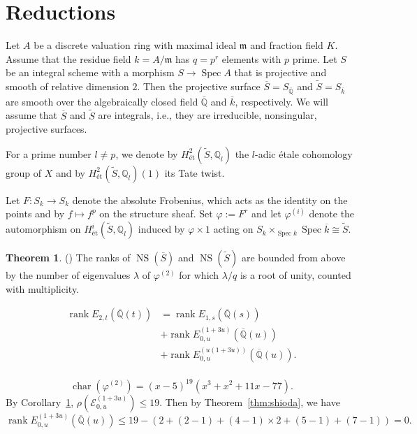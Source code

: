 \documentclass[a4paper]{jarticle} %
\theoremstyle{definition}
\newtheorem{thm}{Theorem}[section]
\theoremstyle{remark}
\DeclareMathOperator{\rank}{rank}
\DeclareMathOperator{\NS}{NS}
\DeclareMathOperator{\chara}{char}
\DeclareMathOperator{\Spec}{Spec}
\begin{document}
\section{Reductions}
Let $A$ be a discrete valuation ring with maximal ideal $\mathfrak{m}$ and fraction field $K$.
Assume that the residue field $k=A/\mathfrak{m}$ has $q=p^r$ elements with $p$ prime.
Let $S$ be an integral scheme with a morphism $S \to \Spec A$ that is projective and smooth of relative dimension $2$.
Then the projective surface $\overline{S}=S_{\overline{\mathbb{Q}}}$ and $\tilde{S}=S_{\overline{k}}$ are smooth over the algebraically closed field $\overline{\mathbb{Q}}$ and $\overline{k}$, respectively.
We will assume that $\overline{S}$ and $\tilde{S}$ are integrals, i.e., they are irreducible, nonsingular, projective surfaces.

For a prime number $l \neq p$, we denote by $H_{\text{\'et}}^{2}(\tilde{S}, \mathbb{Q}_l)$ the $l$-adic \'etale cohomology group of $X$ and by $H_{\text{\'et}}^{2}(\tilde{S}, \mathbb{Q}_l)(1)$ its Tate twist.

Let $F: S_k \to S_k$ denote the absolute Frobenius, which acts as the identity on the points and by $f \mapsto f^p$ on the structure sheaf.
Set $\varphi:=F^{r}$ and let $\varphi^{(i)}$ denote the automorphism on $H_{\text{\'et}}^{i}(\tilde{S}, \mathbb{Q}_l)$ induced by $\varphi \times 1$ acting on $S_k \times_{\Spec k} \Spec \overline{k} \cong \tilde{S}$.

\begin{thm}{(\cite[Corollary 6.4.]{ref:vanluijk2007})}
    \label{cor:ns_upper_bound}
    The ranks of $\NS (\overline{S})$ and $\NS (\tilde{S})$ are bounded from above by the number of eigenvalues $\lambda$ of $\varphi^{(2)}$ for which $\lambda/q$ is a root of unity, counted with multiplicity.
\end{thm}

\begin{equation}
    \label{eq:rankdecomposition}
    \begin{aligned}
        \rank E_{2,t}(\overline{\mathbb{Q}}(t)) &= \rank E_{1,s}(\overline{\mathbb{Q}}(s)) \\
                                                &+ \rank E_{0,u}^{(1 + 3u)}(\overline{\mathbb{Q}}(u)) \\
                                                &+ \rank E_{0,u}^{(u(1 + 3u))}(\overline{\mathbb{Q}}(u)). \\
    \end{aligned}
\end{equation}

\begin{equation*}
    \chara(\varphi^{(2)}) = (x - 5)^{19}(x^{3} + x^{2} + 11 x - 77).
\end{equation*}
By Corollary~\ref{cor:ns_upper_bound}, $\rho(\mathcal{E}_{0,u}^{(1 + 3u)}) \leq 19$.
Then by Theorem~\ref{thm:shioda}, we have
\begin{equation*}
    \rank E_{0,u}^{(1 + 3u)}(\overline{\mathbb{Q}}(u)) \leq 19 - (2 + (2 - 1) + (4 - 1) \times 2 + (5 - 1) + (7 - 1)) = 0.
\end{equation*}

\printbibliography
\end{document}
